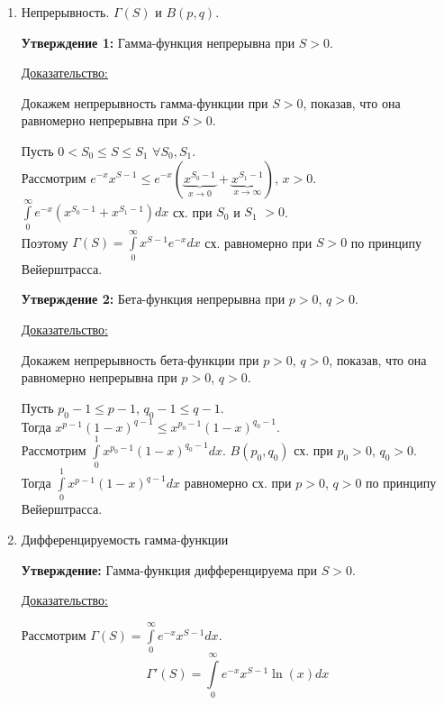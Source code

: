 \documentclass[12pt]{article}
\let\oldint\int
\renewcommand{\int}{\oldint\limits}
\begin{document}
\begin{enumerate}
      \item Непрерывность. $\Gamma(S)$ и $B(p, q)$.\par\noindent
      \textbf{Утверждение 1:} Гамма-функция непрерывна при $S > 0$.\par\noindent
      \underline{Доказательство:}
      \begin{adjustwidth}{1.5em}{1.5em}
          Докажем непрерывность гамма-функции при $S > 0$, показав, что она равномерно непрерывна при $S > 0$.\par\noindent
          Пусть $0 < S_0 \leq S \leq S_1$ $\forall S_0, S_1$.\\
          Рассмотрим $e^{-x} x^{S-1} \leq e^{-x} (\underbrace{x^{S_0-1}}_{x \to 0} + \underbrace{x^{S_1 - 1}}_{x \to \infty})$, $x > 0$.\\
          $\int_{0}^{\infty}e^{-x}(x^{S_0 - 1} + x^{S_1 - 1})dx$ сх. при $S_0$ и $S_1$ $ > 0$.\\
          Поэтому $\Gamma(S) = \int_{0}^{\infty}x^{S-1}e^{-x}dx$ сх. равномерно при $S > 0$ по принципу Вейерштрасса. 
      \end{adjustwidth}
      \textbf{Утверждение 2:} Бета-функция непрерывна при $p > 0$, $q > 0$.\par\noindent
      \underline{Доказательство:}
      \begin{adjustwidth}{1.5em}{1.5em}
          Докажем непрерывность бета-функции при $p > 0$, $q > 0$, показав, что она равномерно непрерывна при $p > 0$, $q > 0$.\par\noindent
          Пусть $p_0 - 1 \leq p - 1$, $q_0 - 1 \leq q - 1$.\\
          Тогда $x^{p-1}(1-x)^{q-1} \leq x^{p_0-1}(1-x)^{q_0-1}$.\\
          Рассмотрим $\int_{0}^{1} x^{p_0-1}(1-x)^{q_0-1}dx$. $B(p_0, q_0)$ сх. при $p_0 > 0$, $q_0 > 0$.\\
          Тогда $\int_{0}^{1}x^{p-1}(1-x)^{q-1}dx$ равномерно сх. при $p > 0$, $q > 0$ по принципу Вейерштрасса.
      \end{adjustwidth}
      \item Дифференцируемость гамма-функции\par\noindent
      \textbf{Утверждение:} Гамма-функция дифференцируема при $S > 0$.\par\noindent
      \underline{Доказательство:}
      \begin{adjustwidth}{1.5em}{1.5em}
          Рассмотрим $\Gamma(S) = \int_{0}^{\infty}e^{-x}x^{S-1}dx$.
          \[ \Gamma'(S) = \int_{0}^{\infty}e^{-x}x^{S-1}\ln(x)dx \]

\end{adjustwidth}
\end{enumerate}
\end{document}
